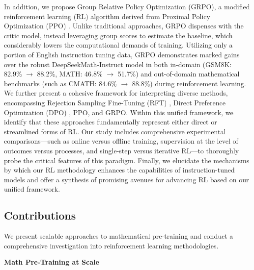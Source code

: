 In addition, we propose Group Relative Policy Optimization (GRPO), a modified reinforcement learning (RL) algorithm derived from Proximal Policy Optimization (PPO) \citep{schulman2017proximal}. Unlike traditional approaches, GRPO dispenses with the critic model, instead leveraging group scores to estimate the baseline, which considerably lowers the computational demands of training. Utilizing only a portion of English instruction tuning data, GRPO demonstrates marked gains over the robust DeepSeekMath-Instruct model in both in-domain (GSM8K: 82.9\% $\rightarrow$ 88.2\%, MATH: 46.8\% $\rightarrow$ 51.7\%) and out-of-domain mathematical benchmarks (such as CMATH: 84.6\% $\rightarrow$ 88.8\%) during reinforcement learning. We further present a cohesive framework for interpreting diverse methods, encompassing Rejection Sampling Fine-Tuning (RFT) \citep{yuan2023scaling}, Direct Preference Optimization (DPO) \citep{dpo}, PPO, and GRPO. Within this unified framework, we identify that these approaches fundamentally represent either direct or streamlined forms of RL. Our study includes comprehensive experimental comparisons—such as online versus offline training, supervision at the level of outcomes versus processes, and single-step versus iterative RL—to thoroughly probe the critical features of this paradigm. Finally, we elucidate the mechanisms by which our RL methodology enhances the capabilities of instruction-tuned models and offer a synthesis of promising avenues for advancing RL based on our unified framework.

\subsection{Contributions}
We present scalable approaches to mathematical pre-training and conduct a comprehensive investigation into reinforcement learning methodologies.

\textbf{Math Pre-Training at Scale}

